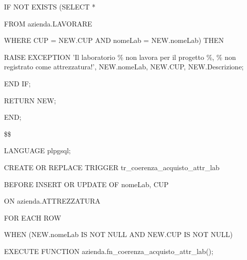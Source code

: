 \begin{flushleft}
\begin{description}
\begin{description}
                    \vspace{0.5cm}

                    \item IF NOT EXISTS (SELECT *
                    \item FROM azienda.LAVORARE
                    \item WHERE CUP = NEW.CUP AND nomeLab = NEW.nomeLab) THEN
                    \begin {description}
                        \item RAISE EXCEPTION 'Il laboratorio \% non lavora per il progetto \%, \% non registrato come attrezzatura!', NEW.nomeLab, NEW.CUP, NEW.Descrizione;
                    \end{description}
                    \item END IF;
                
                    \item RETURN NEW;

                \end{description}

                \item END;
                \item \$\$
                \item LANGUAGE plpgsql;
            \end{description}
        \end{flushleft}
    \normalfont

    \ttfamily
        \begin{flushleft}
            \begin{description}
                \item CREATE OR REPLACE TRIGGER tr\_coerenza\_acquisto\_attr\_lab
                \item BEFORE INSERT OR UPDATE OF nomeLab, CUP
                \item ON azienda.ATTREZZATURA
                \item FOR EACH ROW
                \item WHEN (NEW.nomeLab IS NOT NULL AND NEW.CUP IS NOT NULL) 
                \item EXECUTE FUNCTION azienda.fn\_coerenza\_acquisto\_attr\_lab();
            \end{description}
        \end{flushleft}
    \normalfont



